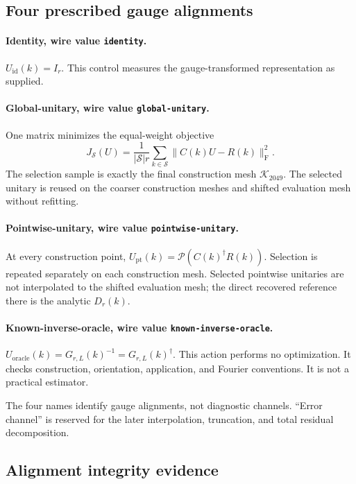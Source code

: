 \documentclass[11pt]{article}
\newcommand{\Frob}{\mathrm F}
\begin{document}
\subsection{Four prescribed gauge alignments}

\paragraph{Identity, wire value \texttt{identity}.}
$U_{\mathrm{id}}(k)=I_r$. This control measures the gauge-transformed representation as supplied.

\paragraph{Global-unitary, wire value \texttt{global-unitary}.}
One matrix minimizes the equal-weight objective
\begin{equation}
 J_{\mathcal S}(U)=\frac{1}{|\mathcal S|r}
 \sum_{k\in\mathcal S}\|C(k)U-R(k)\|_\Frob^2.
 \label{eq:global-objective}
\end{equation}
The selection sample is exactly the final construction mesh $\mathcal K_{2049}$. The
selected unitary is reused on the coarser construction meshes and shifted evaluation
mesh without refitting.

\paragraph{Pointwise-unitary, wire value \texttt{pointwise-unitary}.}
At every construction point,
$U_{\mathrm{pt}}(k)=\mathcal P(C(k)^\dagger R(k))$. Selection is repeated separately on
each construction mesh. Selected pointwise unitaries are not interpolated to the shifted
evaluation mesh; the direct recovered reference there is the analytic $D_r(k)$.

\paragraph{Known-inverse-oracle, wire value \texttt{known-inverse-oracle}.}
$U_{\mathrm{oracle}}(k)=G_{r,L}(k)^{-1}=G_{r,L}(k)^\dagger$. This action performs no
optimization. It checks construction, orientation, application, and Fourier conventions.
It is not a practical estimator.

The four names identify gauge alignments, not diagnostic channels. ``Error channel'' is
reserved for the later interpolation, truncation, and total residual decomposition.

\subsection{Alignment integrity evidence}
\end{document}
